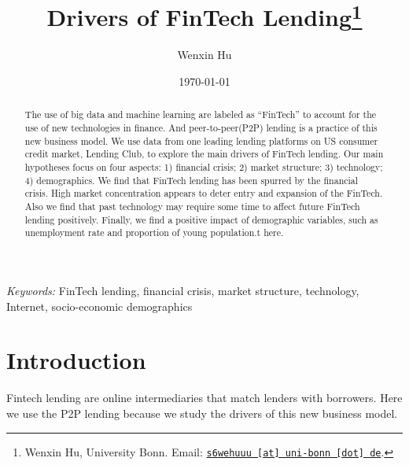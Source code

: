 \documentclass[11pt, a4paper, leqno]{article}
\begin{document}
\title{Drivers of FinTech Lending\thanks{Wenxin Hu, University Bonn. Email: \href{mailto:s6wehuuu@uni-bonn.de}{\nolinkurl{s6wehuuu [at] uni-bonn [dot] de}}.}}

\author{Wenxin Hu}

\date{
\today
}

\maketitle

\begin{abstract}
\noindent
The use of big data and machine learning are labeled as “FinTech” to account for the use of new technologies in finance. And peer-to-peer(P2P) lending is a practice of this new business model. We use data from one leading lending platforms on US consumer credit market, Lending Club, to explore the main drivers of FinTech lending. Our main hypotheses focus on four aspects: 1) financial crisis; 2) market structure; 3) technology; 4) demographics. We find that FinTech lending has been spurred by the financial crisis. High market concentration appears to deter entry and expansion of the FinTech. Also we find that past technology may require some time to affect future FinTech lending positively. Finally, we find a positive impact of demographic variables, such as unemployment rate and proportion of young population.t here.
\end{abstract}
\vspace{0.5cm}
\textit{Keywords:} FinTech lending, financial crisis, market structure, technology, Internet, socio-economic demographics


\newpage
\tableofcontents
\newpage
\listoffigures
\newpage
\listoftables
\newpage


\section{Introduction}


Fintech lending are online intermediaries that match lenders with borrowers. Here we use the P2P lending because we study the drivers of this new business model.
\end{document}
